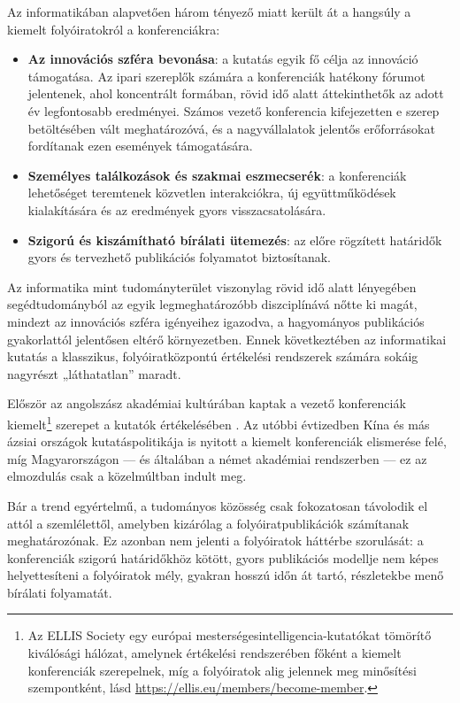 \documentclass[12pt,a4paper]{article}
\begin{document}
Az informatikában alapvetően három tényező miatt került át a hangsúly a kiemelt folyóiratokról a konferenciákra:
\begin{itemize}
\item \textbf{Az innovációs szféra bevonása}: a kutatás egyik fő célja az innováció támogatása. Az ipari szereplők számára a konferenciák hatékony fórumot jelentenek, ahol koncentrált formában, rövid idő alatt áttekinthetők az adott év legfontosabb eredményei. Számos vezető konferencia kifejezetten e szerep betöltésében vált meghatározóvá, és a nagyvállalatok jelentős erőforrásokat fordítanak ezen események támogatására.
\item \textbf{Személyes találkozások és szakmai eszmecserék}: a konferenciák lehetőséget teremtenek közvetlen interakciókra, új együttműködések kialakítására és az eredmények gyors visszacsatolására.
\item \textbf{Szigorú és kiszámítható bírálati ütemezés}: az előre rögzített határidők gyors és tervezhető publikációs folyamatot biztosítanak.
\end{itemize}

Az informatika mint tudományterület viszonylag rövid idő alatt lényegében segédtudományból az egyik legmeghatározóbb diszciplínává nőtte ki magát, mindezt az innovációs szféra igényeihez igazodva, a hagyományos publikációs gyakorlattól jelentősen eltérő környezetben. Ennek következtében az informatikai kutatás a klasszikus, folyóiratközpontú értékelési rendszerek számára sokáig nagyrészt „láthatatlan” maradt. %

Először az angolszász akadémiai kultúrában kaptak a vezető konferenciák kiemelt\footnote{Az ELLIS Society egy európai mesterségesintelligencia-kutatókat tömörítő kiválósági hálózat, amelynek értékelési rendszerében főként a kiemelt konferenciák szerepelnek, míg a folyóiratok alig jelennek meg minősítési szempontként, lásd \url{https://ellis.eu/members/become-member}.} szerepet a kutatók értékelésében \cite{fortnow2009time,vardi2009conferences}. Az utóbbi évtizedben Kína és más ázsiai országok kutatáspolitikája is nyitott a kiemelt konferenciák elismerése felé, míg Magyarországon — és általában a német akadémiai rendszerben — ez az elmozdulás csak a közelmúltban indult meg.

Bár a trend egyértelmű, a tudományos közösség csak fokozatosan távolodik el attól a szemlélettől, amelyben kizárólag a folyóiratpublikációk számítanak meghatározónak. Ez azonban nem jelenti a folyóiratok háttérbe szorulását: a konferenciák szigorú határidőkhöz kötött, gyors publikációs modellje nem képes helyettesíteni a folyóiratok mély, gyakran hosszú időn át tartó, részletekbe menő bírálati folyamatát.
\end{document}
